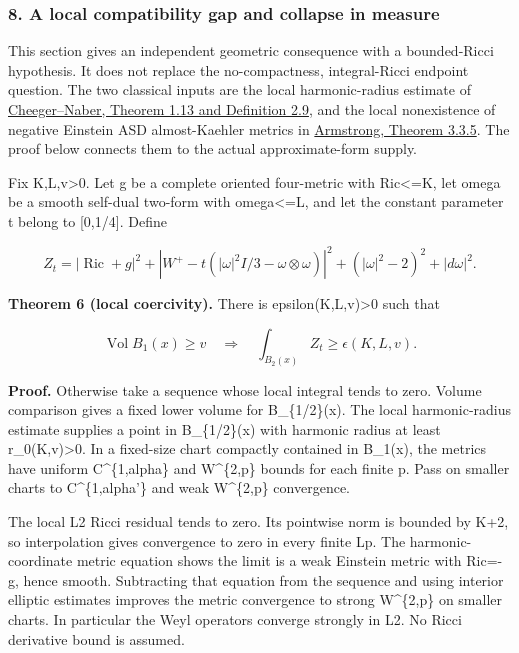 \documentclass[
  10pt,
]{article}
\begin{document}
\hypertarget{a-local-compatibility-gap-and-collapse-in-measure}{%
\subsubsection{8. A local compatibility gap and collapse in
measure}\label{a-local-compatibility-gap-and-collapse-in-measure}}

This section gives an independent geometric consequence with a
bounded-Ricci hypothesis. It does not replace the no-compactness,
integral-Ricci endpoint question. The two classical inputs are the local
harmonic-radius estimate of
\href{https://arxiv.org/pdf/1406.6534}{Cheeger--Naber, Theorem 1.13 and
Definition 2.9}, and the local nonexistence of negative Einstein ASD
almost-Kaehler metrics in
\href{https://johnarmstrongmaths.com/publications/resources/thesis.pdf}{Armstrong,
Theorem 3.3.5}. The proof below connects them to the actual
approximate-form supply.

Fix K,L,v\textgreater0. Let g be a complete oriented four-metric with
\textbar Ric\textbar\textless=K, let omega be a smooth self-dual
two-form with \textbar omega\textbar\textless=L, and let the constant
parameter t belong to {[}0,1/4{]}. Define

\[
 Z_t=|\operatorname{Ric}+g|^2+
 |W^+-t(|\omega|^2I/3-\omega\otimes\omega)|^2
                  +( |\omega|^2-2)^2+|d\omega|^2.       \tag{8.1}
\]

\textbf{Theorem 6 (local coercivity).} There is
epsilon(K,L,v)\textgreater0 such that

\[
       \operatorname{Vol}B_1(x)\ge v
            \quad\Longrightarrow\quad
       \int_{B_2(x)}Z_t\ge\epsilon(K,L,v).             \tag{8.2}
\]

\textbf{Proof.} Otherwise take a sequence whose local integral tends to
zero. Volume comparison gives a fixed lower volume for B\_\{1/2\}(x).
The local harmonic-radius estimate supplies a point in B\_\{1/2\}(x)
with harmonic radius at least r\_0(K,v)\textgreater0. In a fixed-size
chart compactly contained in B\_1(x), the metrics have uniform
C\^{}\{1,alpha\} and W\^{}\{2,p\} bounds for each finite p. Pass on
smaller charts to C\^{}\{1,alpha'\} and weak W\^{}\{2,p\} convergence.

The local L2 Ricci residual tends to zero. Its pointwise norm is bounded
by K+2, so interpolation gives convergence to zero in every finite Lp.
The harmonic-coordinate metric equation shows the limit is a weak
Einstein metric with Ric=-g, hence smooth. Subtracting that equation
from the sequence and using interior elliptic estimates improves the
metric convergence to strong W\^{}\{2,p\} on smaller charts. In
particular the Weyl operators converge strongly in L2. No Ricci
derivative bound is assumed.
\end{document}
